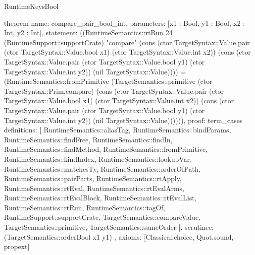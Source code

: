 \begin{lexlean}{RuntimeKeysBool}
\begin{semanticmodule}
theorem{
  name: compare_pair_bool_int,
  parameters: [x1 : Bool, y1 : Bool, x2 : Int, y2 : Int],
  statement: ((RuntimeSemantics::rtRun 24 (RuntimeSupport::supportCrate) "compare" (cons (ctor TargetSyntax::Value.pair (ctor TargetSyntax::Value.bool x1) (ctor TargetSyntax::Value.int x2)) (cons (ctor TargetSyntax::Value.pair (ctor TargetSyntax::Value.bool y1) (ctor TargetSyntax::Value.int y2)) (nil TargetSyntax::Value)))) = (RuntimeSemantics::fromPrimitive (TargetSemantics::primitive (ctor TargetSyntax::Prim.compare) (cons (ctor TargetSyntax::Value.pair (ctor TargetSyntax::Value.bool x1) (ctor TargetSyntax::Value.int x2)) (cons (ctor TargetSyntax::Value.pair (ctor TargetSyntax::Value.bool y1) (ctor TargetSyntax::Value.int y2)) (nil TargetSyntax::Value)))))),
  proof: term_cases{
    definitions: [
      RuntimeSemantics::aliasTag,
      RuntimeSemantics::bindParams,
      RuntimeSemantics::findFree,
      RuntimeSemantics::findIn,
      RuntimeSemantics::findMethod,
      RuntimeSemantics::fromPrimitive,
      RuntimeSemantics::kindIndex,
      RuntimeSemantics::lookupVar,
      RuntimeSemantics::matchesTy,
      RuntimeSemantics::orderOfPath,
      RuntimeSemantics::pairParts,
      RuntimeSemantics::rtApply,
      RuntimeSemantics::rtEval,
      RuntimeSemantics::rtEvalArms,
      RuntimeSemantics::rtEvalBlock,
      RuntimeSemantics::rtEvalList,
      RuntimeSemantics::rtRun,
      RuntimeSemantics::tagOf,
      RuntimeSupport::supportCrate,
      TargetSemantics::compareValue,
      TargetSemantics::primitive,
      TargetSemantics::sameOrder
    ],
    scrutinee: (TargetSemantics::orderBool x1 y1)
  },
  axioms: [Classical.choice, Quot.sound, propext]
}


\end{semanticmodule}
\end{lexlean}
